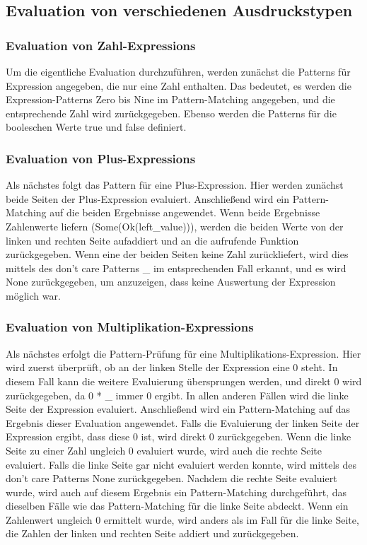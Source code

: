 \documentclass[a4paper, 1ppt]{article}
\begin{document}
\subsection{Evaluation von verschiedenen Ausdruckstypen}
\subsubsection{Evaluation von Zahl-Expressions}
Um die eigentliche Evaluation durchzuführen, werden zunächst die Patterns für Expression angegeben, die nur eine Zahl enthalten. Das bedeutet, es werden die Expression-Patterns Zero bis Nine im Pattern-Matching angegeben, und die entsprechende Zahl wird zurückgegeben. Ebenso werden die Patterns für die booleschen Werte true und false definiert.
\subsubsection{Evaluation von Plus-Expressions}
Als nächstes folgt das Pattern für eine Plus-Expression. Hier werden zunächst beide Seiten der Plus-Expression evaluiert. Anschließend wird ein Pattern-Matching auf die beiden Ergebnisse angewendet. Wenn beide Ergebnisse Zahlenwerte liefern (Some(Ok(left\_value))), werden die beiden Werte von der linken und rechten Seite aufaddiert und an die aufrufende Funktion zurückgegeben. Wenn eine der beiden Seiten keine Zahl zurückliefert, wird dies mittels des don't care Patterns \_ im entsprechenden Fall erkannt, und es wird None zurückgegeben, um anzuzeigen, dass keine Auswertung der Expression möglich war.
\subsubsection{Evaluation von Multiplikation-Expressions}
Als nächstes erfolgt die Pattern-Prüfung für eine Multiplikations-Expression. Hier wird zuerst überprüft, ob an der linken Stelle der Expression eine 0 steht. In diesem Fall kann die weitere Evaluierung übersprungen werden, und direkt 0 wird zurückgegeben, da 0 * \_ immer 0 ergibt. In allen anderen Fällen wird die linke Seite der Expression evaluiert. Anschließend wird ein Pattern-Matching auf das Ergebnis dieser Evaluation angewendet. Falls die Evaluierung der linken Seite der Expression ergibt, dass diese 0 ist, wird direkt 0 zurückgegeben. Wenn die linke Seite zu einer Zahl ungleich 0 evaluiert wurde, wird auch die rechte Seite evaluiert. Falls die linke Seite gar nicht evaluiert werden konnte, wird mittels des don't care Patterns None zurückgegeben. Nachdem die rechte Seite evaluiert wurde, wird auch auf diesem Ergebnis ein Pattern-Matching durchgeführt, das dieselben Fälle wie das Pattern-Matching für die linke Seite abdeckt. Wenn ein Zahlenwert ungleich 0 ermittelt wurde, wird anders als im Fall für die linke Seite, die Zahlen der linken und rechten Seite addiert und zurückgegeben.
\end{document}
